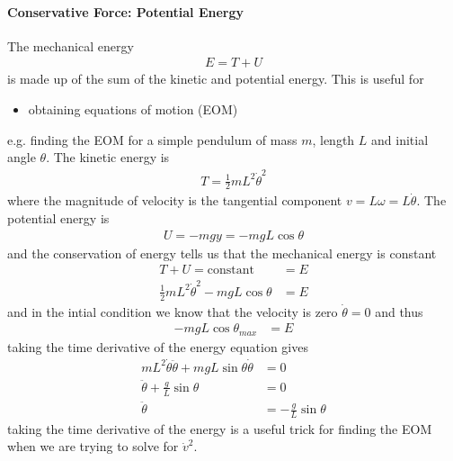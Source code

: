 \documentclass[../main.tex]{subfiles}
\begin{document}
\paragraph{Conservative Force: Potential Energy} The mechanical energy
\begin{align*}
    E = T + U
\end{align*}
is made up of the sum of the kinetic and potential energy. This is useful for
\begin{itemize}
    \item obtaining equations of motion (EOM)
\end{itemize}
e.g. finding the EOM for a simple pendulum of mass $m$, length $L$ and initial angle $\theta$. The
kinetic energy is
\begin{align*}
    T = \frac{1}{2} m L^2 \dot{\theta}^2
\end{align*}
where the magnitude of velocity is the tangential component $v = L \omega = L \dot \theta$. The 
potential energy is
\begin{align*}
    U = -mgy = -mg L \cos\theta
\end{align*}
and the conservation of energy tells us that the mechanical energy is constant
\begin{align*}
    T + U = \textrm{constant} &= E \\
    \frac{1}{2} m L^2 \dot{\theta}^2 - mg L \cos\theta &= E
\end{align*}
and in the intial condition we know that the velocity is zero $\dot{\theta} = 0$ and thus 
\begin{align*}
    -mg L \cos\theta_{max} &= E
\end{align*}
taking the time derivative of the energy equation gives
\begin{align*}
    m L^2 \dot{\theta} \ddot{\theta} + mg L \sin\theta \dot{\theta} &= 0 \\
    \ddot{\theta} + \frac{g}{L} \sin\theta &= 0 \\
    \ddot \theta &= -\frac{g}{L} \sin\theta
\end{align*}
taking the time derivative of the energy is a useful trick for finding the EOM when we are trying to
solve for $\dot{v}^2$.
\end{document}
